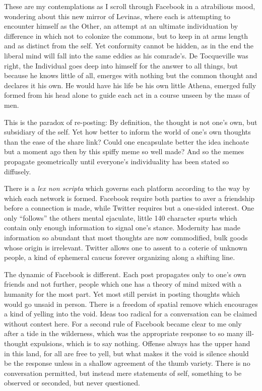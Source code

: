 \documentclass[ebook, 10pt, openright, onecolumn]{memoir}
\begin{document}
These are my contemplations as I scroll through Facebook in a atrabilious mood,
wondering about this new mirror of Levinas, where each is attempting to encounter
himself as the Other, an attempt at an ultimate individuation by difference in
which not to colonize the commons, but to keep in at arms length and as distinct
from the self.  Yet conformity cannot be hidden, as in the end the liberal mind
will fall into the same eddies as his comrade's. De Tocqueville was right, the
Individual goes deep into himself for the answer to all things, but because he
knows little of all, emerges with nothing but the common thought and declares it
his own.  He would have his life be his own little Athena, emerged fully formed
from his head alone to guide each act in a course unseen by the mass of men.

This is the paradox of re-posting: By definition, the thought is not one's own,
but subsidiary of the self.  Yet how better to inform the world of one's own
thoughts than the ease of the share link?  Could one encapsulate better the idea
inchoate but a moment ago then by this spiffy meme so well made?  And so the
memes propagate geometrically until everyone's individuality has been stated so
diffusely.

There is a \textit{lex non scripta} which governs each platform according to the
way by which each network is formed.  Facebook require both parties to aver a
friendship before a connection is made, while Twitter requires but a one-sided
interest.  One only ``follows'' the others mental ejaculate, little 140
character spurts which contain only enough information to signal one's stance.
Modernity has made information so abundant that most thoughts are now
commodified, bulk goods whose origin is irrelevant.  Twitter allows one to
assent to a coterie of unknown people, a kind of ephemeral caucus forever
organizing along a shifting line.

The dynamic of Facebook is different.  Each post propagates only to one's own
friends and not further, people which one has a theory of mind mixed with a
humanity for the most part.  Yet most still persist in posting thoughts which
would go unsaid in person.  There is a freedom of spatial remove which
encourages a kind of yelling into the void. Ideas too radical for a conversation
can be claimed without contest here.  For a second rule of Facebook became clear
to me only after a tide in the wilderness, which was the appropriate response to
so many ill-thought expulsions, which is to say nothing.  Offense always has the
upper hand in this land, for all are free to yell, but what makes it the void is
silence should be the response unless in a shallow agreement of the thumb
variety.  There is no conversation permitted, but instead mere statements of
self, something to be observed or seconded, but never questioned.
\end{document}
